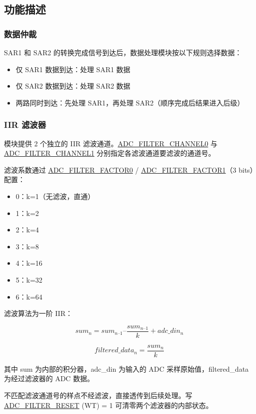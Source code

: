 \documentclass[main\_\_CN.tex]{subfiles}
\begin{document}
\subsection{功能描述}
\label{sec:adc-datapath-func-descr}

\subsubsection{数据仲裁}
SAR1 和 SAR2 的转换完成信号到达后，数据处理模块按以下规则选择数据：
\begin{itemize}
    \item 仅 SAR1 数据到达：处理 SAR1 数据
    \item 仅 SAR2 数据到达：处理 SAR2 数据
    \item 两路同时到达：先处理 SAR1，再处理 SAR2（顺序完成后结果进入后级）
\end{itemize}

\subsubsection{IIR 滤波器}
模块提供 2 个独立的 IIR 滤波通道。\hyperref[fielddesc:ADCFILTERCHANNEL0]{ADC\_FILTER\_CHANNEL0} 与 \hyperref[fielddesc:ADCFILTERCHANNEL1]{ADC\_FILTER\_CHANNEL1} 分别指定各滤波通道要滤波的通道号。

滤波系数通过 \hyperref[fielddesc:ADCFILTERFACTOR0]{ADC\_FILTER\_FACTOR0} / \hyperref[fielddesc:ADCFILTERFACTOR1]{ADC\_FILTER\_FACTOR1}（3 bits）配置：
\begin{itemize}
    \item 0：k=1（无滤波，直通）
    \item 1：k=2
    \item 2：k=4
    \item 3：k=8
    \item 4：k=16
    \item 5：k=32
    \item 6：k=64
\end{itemize}

滤波算法为一阶 IIR：

\[
sum_{n} = sum_{n–1} – \frac{sum_{n–1}}{k} + adc\_din_{n}
\]

\[
filtered\_data_{n} = \frac{sum_{n}}{k}
\]

其中 sum 为内部的积分器，adc\_din 为输入的 ADC 采样原始值，filtered\_data 为经过滤波器的 ADC 数据。

不匹配滤波通道号的样点不经滤波，直接透传到后续处理。写 \hyperref[fielddesc:ADCFILTERRESET]{ADC\_FILTER\_RESET} (WT) = 1 可清零两个滤波器的内部状态。
\end{document}
